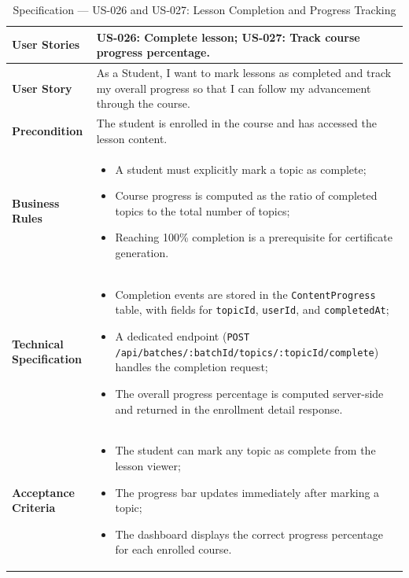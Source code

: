 \begin{table}[H]
\centering
\caption{Specification — US-026 and US-027: Lesson Completion and Progress Tracking}
\label{tab:us026}
\renewcommand{\arraystretch}{1.2}
\begin{tabularx}{\textwidth}{|p{3.5cm}|X|}
\hline
\textbf{User Stories} & US-026: Complete lesson; US-027: Track course progress percentage. \\
\hline
\textbf{User Story} & As a Student, I want to mark lessons as completed and track my overall progress so that I can follow my advancement through the course. \\
\hline
\textbf{Precondition} & The student is enrolled in the course and has accessed the lesson content. \\
\hline
\textbf{Business Rules} &
\begin{itemize}[noitemsep, topsep=2pt]
  \item A student must explicitly mark a topic as complete;
  \item Course progress is computed as the ratio of completed topics to the total number of topics;
  \item Reaching 100\% completion is a prerequisite for certificate generation.
\end{itemize} \\
\hline
\textbf{Technical Specification} &
\begin{itemize}[noitemsep, topsep=2pt]
  \item Completion events are stored in the \texttt{ContentProgress} table, with fields for \texttt{topicId}, \texttt{userId}, and \texttt{completedAt};
  \item A dedicated endpoint (\texttt{POST /api/batches/:batchId/topics/:topicId/complete}) handles the completion request;
  \item The overall progress percentage is computed server-side and returned in the enrollment detail response.
\end{itemize} \\
\hline
\textbf{Acceptance Criteria} &
\begin{itemize}[noitemsep, topsep=2pt]
  \item The student can mark any topic as complete from the lesson viewer;
  \item The progress bar updates immediately after marking a topic;
  \item The dashboard displays the correct progress percentage for each enrolled course.
\end{itemize} \\
\hline
\end{tabularx}
\end{table}

